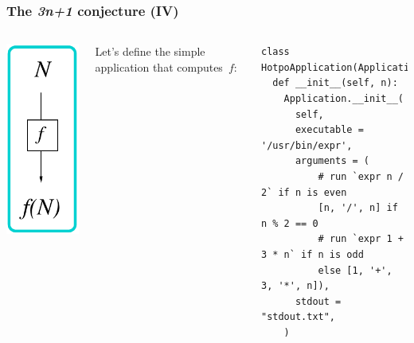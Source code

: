 \documentclass[english,serif,mathserif,xcolor=pdftex,dvipsnames,table]{beamer}
\begin{document}
\begin{frame}[fragile]
\frametitle{The \emph{3n+1} conjecture (IV)}
\label{sec:10}

\begin{columns}
  \begin{center}
    \includegraphics[height=0.8\textheight]{fig/A}
  \end{center}

  Let's define the simple application that computes~$f$:
\begin{lstlisting}
class HotpoApplication(Application):
  def __init__(self, n):
    Application.__init__(
      self,
      executable = '/usr/bin/expr',
      arguments = (
          # run `expr n / 2` if n is even
          [n, '/', n] if n % 2 == 0
          # run `expr 1 + 3 * n` if n is odd
          else [1, '+', 3, '*', n]),
      stdout = "stdout.txt",
    )
\end{lstlisting}
  \end{columns}
\end{frame}
\end{document}
